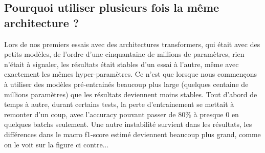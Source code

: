 \subsection{Pourquoi utiliser plusieurs fois la même architecture ?}
Lors de nos premiers essais avec des architectures transformers, qui était avec des petits modèles, de l'ordre d'une cinquantaine de millions de paramètres, rien n'était à signaler, les résultats était stables d'un essai à l'autre, même avec exactement les mêmes hyper-paramètres. Ce n'est que lorsque nous commençons à utiliser des modèles pré-entrainés beaucoup plus large (quelques centaine de millions paramètres) que les résultats deviennent moins stables. Tout d'abord de temps à autre, durant certains tests, la perte d'entrainement se mettait à remonter d'un coup, avec l'accuracy pouvant passer de 80\% à presque 0 en quelques batchs seulement. Une autre instabilité survient dans les résultats, les différences dans le macro f1-score estimé deviennent beaucoup plus grand, comme on le voit sur la figure ci contre...

